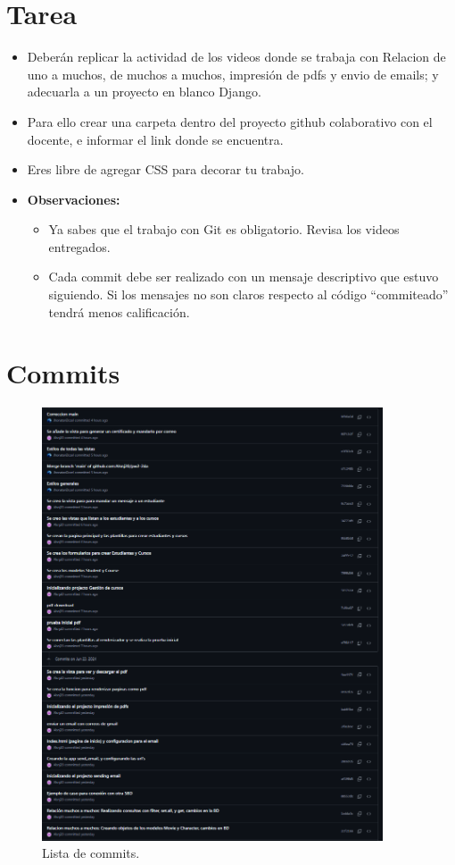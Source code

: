 \documentclass{article}
\begin{document}
\tableofcontents
\pagebreak


\section{Tarea}
\begin{itemize}
	\item Deberán replicar la actividad de los videos donde se trabaja con Relacion de uno a muchos, de muchos a muchos, impresión de pdfs y envio de emails; y adecuarla a un proyecto en blanco Django.
	\item Para ello crear una carpeta dentro del proyecto github colaborativo con el docente, e informar el link donde se encuentra.
	\item Eres libre de agregar CSS para decorar tu trabajo.
	\item \textbf{Observaciones:}
	      \begin{itemize}
		      \item Ya sabes que el trabajo con Git es obligatorio. Revisa los videos entregados.
		      \item Cada commit debe ser realizado con un mensaje descriptivo que estuvo siguiendo. Si los mensajes no son claros respecto al código “commiteado” tendrá menos calificación.
	      \end{itemize}
\end{itemize}
\pagebreak
\section{Commits}
\begin{figure}[H]
	\centering
	\includegraphics[width=0.9\textwidth,keepaspectratio]{img/commits.png}
	\caption{Lista de commits.}
\end{figure}
\pagebreak
\end{document}
